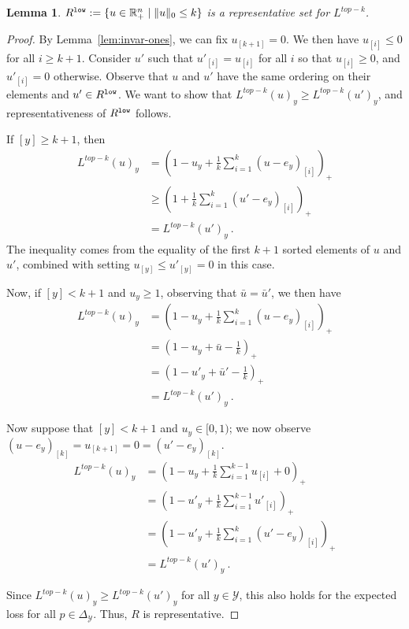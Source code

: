 \documentclass[12pt]{article}
\newcommand{\reals}{\mathbb{R}}
\newcommand{\simplex}{\Delta_\Y}
\newcommand{\Y}{\mathcal{Y}}
\newtheorem{lemma}{Lemma}
\begin{document}
\begin{lemma}\label{lem:extra-elts-zero}
	$R^{\tt low} := \{u \in \reals^n_+ \mid \|u\|_0 \leq k\}$ is a representative set for $L^{top-k}$.
\end{lemma}
\begin{proof}
	By Lemma~\ref{lem:invar-ones}, we can fix $u_{[k+1]} = 0$.
	We then have $u_{[i]} \leq 0$ for all $i \geq k+1$.
	Consider $u'$ such that $u'_{[i]} = u_{[i]}$ for all $i$ so that $u_{[i]} \geq 0$, and $u'_{[i]} = 0$ otherwise.
	Observe that $u$ and $u'$ have the same ordering on their elements and $u' \in R^{\tt low}$.
	We want to show that $L^{top-k}(u)_y \geq L^{top-k}(u')_y$, and representativeness of $R^{\tt low}$ follows.
	
	If $[y] \geq k+1$, then 
	\begin{align*}
	L^{top-k}(u)_y &= \left(1 - u_y + \frac 1 k \sum_{i=1}^k (u - e_y)_{[i]}\right)_+ \\
	&\geq \left(1 + \frac {1}{k} \sum_{i=1}^k (u' - e_y)_{[i]}\right)_+\\
	&= L^{top-k}(u')_y~.~
	\end{align*}
	The inequality comes from the equality of the first $k+1$ sorted elements of $u$ and $u'$, combined with setting $u_{[y]} \leq u'_{[y]} = 0$ in this case.
	
	Now, if $[y] < k+1$ and $u_y \geq 1$, observing that $\bar u = \bar u'$, we then have 
	\begin{align*}
	L^{top-k}(u)_y &= \left(1 - u_y + \frac 1 k \sum_{i=1}^k (u - e_y)_{[i]}\right)_+ \\
	&= \left(1 - u_y + \bar u - \frac 1 k\right)_+\\
	&= \left(1 - u'_y + \bar u' - \frac 1 k\right)_+\\
	&= L^{top-k}(u')_y~.~
	\end{align*}
	
	Now suppose that $[y] < k+1$ and $u_y \in [0,1)$; we now observe $(u - e_y)_{[k]} = u_{[k+1]} = 0 = (u' - e_y)_{[k]}$. 
	\begin{align*}
	L^{top-k}(u)_y &= \left(1 - u_y + \frac 1 k \sum_{i=1}^{k-1} u_{[i]} + 0 \right)_+\\
	&= \left(1 - u'_y + \frac 1 k \sum_{i=1}^{k-1} u'_{[i]}\right)_+\\
	&= \left(1 - u'_y + \frac 1 k \sum_{i=1}^{k} (u' - e_y)_{[i]}\right)_+\\
	&= L^{top-k}(u')_y~.~
	\end{align*}

	Since $L^{top-k}(u)_y \geq L^{top-k}(u')_y$ for all $y \in \Y$, this also holds for the expected loss for all $p \in \simplex$.
	Thus, $R$ is representative.
\end{proof}
\end{document}
